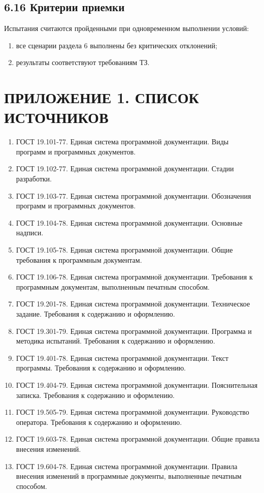 \documentclass[12pt,a4paper]{article}
\begin{document}
\subsection*{6.16 Критерии приемки}
Испытания считаются пройденными при одновременном выполнении условий:
\begin{enumerate}
  \item все сценарии раздела 6 выполнены без критических отклонений;
  \item результаты соответствуют требованиям ТЗ.
\end{enumerate}

\clearpage
\section*{ПРИЛОЖЕНИЕ 1. СПИСОК ИСТОЧНИКОВ}
\begin{enumerate}
  \item ГОСТ 19.101-77. Единая система программной документации. Виды программ и программных документов.
  \item ГОСТ 19.102-77. Единая система программной документации. Стадии разработки.
  \item ГОСТ 19.103-77. Единая система программной документации. Обозначения программ и программных документов.
  \item ГОСТ 19.104-78. Единая система программной документации. Основные надписи.
  \item ГОСТ 19.105-78. Единая система программной документации. Общие требования к программным документам.
  \item ГОСТ 19.106-78. Единая система программной документации. Требования к программным документам, выполненным печатным способом.
  \item ГОСТ 19.201-78. Единая система программной документации. Техническое задание. Требования к содержанию и оформлению.
  \item ГОСТ 19.301-79. Единая система программной документации. Программа и методика испытаний. Требования к содержанию и оформлению.
  \item ГОСТ 19.401-78. Единая система программной документации. Текст программы. Требования к содержанию и оформлению.
  \item ГОСТ 19.404-79. Единая система программной документации. Пояснительная записка. Требования к содержанию и оформлению.
  \item ГОСТ 19.505-79. Единая система программной документации. Руководство оператора. Требования к содержанию и оформлению.
  \item ГОСТ 19.603-78. Единая система программной документации. Общие правила внесения изменений.
  \item ГОСТ 19.604-78. Единая система программной документации. Правила внесения изменений в программные документы, выполненные печатным способом.
\end{enumerate}
\end{document}

